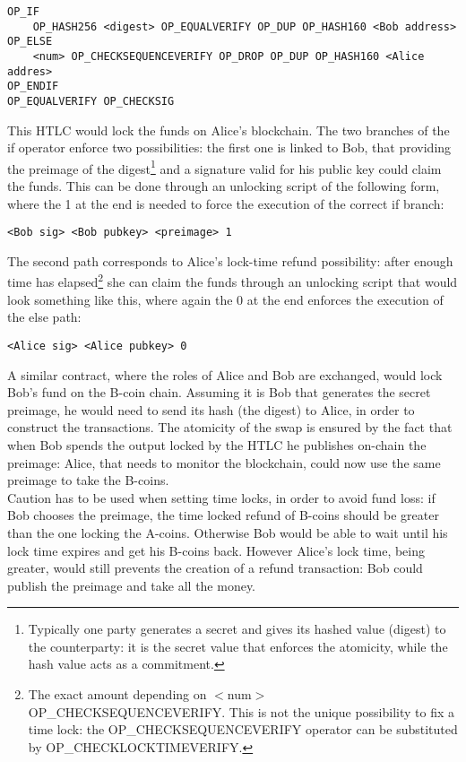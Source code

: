 \bigskip

\begin{lstlisting}[frame=single]
OP_IF 
	OP_HASH256 <digest> OP_EQUALVERIFY OP_DUP OP_HASH160 <Bob address>
OP_ELSE
	<num> OP_CHECKSEQUENCEVERIFY OP_DROP OP_DUP OP_HASH160 <Alice addres>
OP_ENDIF
OP_EQUALVERIFY OP_CHECKSIG
\end{lstlisting}

\bigskip
\noindent
This HTLC would lock the funds on Alice's blockchain. The two branches of the if operator enforce two possibilities: the first one is linked to Bob, that providing the preimage of the digest\footnote{Typically one party generates a secret and gives its hashed value (digest) to the counterparty: it is the secret value that enforces the atomicity, while the hash value acts as a commitment.} and a signature valid for his public key could claim the funds. This can be done through an unlocking script of the following form, where the 1 at the end is needed to force the execution of the correct if branch:

\bigskip

\begin{lstlisting}[frame=single]
<Bob sig> <Bob pubkey> <preimage> 1
\end{lstlisting}

\bigskip
\noindent
The second path corresponds to Alice's lock-time refund possibility: after enough time has elapsed\footnote{The exact amount depending on $<$num$>$ OP\_CHECKSEQUENCEVERIFY. This is not the unique possibility to fix a time lock: the OP\_CHECKSEQUENCEVERIFY operator can be substituted by OP\_CHECKLOCKTIMEVERIFY.} she can claim the funds through an unlocking script that would look something like this, where again the 0 at the end enforces the execution of the else path:

\bigskip

\begin{lstlisting}[frame=single]
<Alice sig> <Alice pubkey> 0
\end{lstlisting}

\bigskip
\noindent
A similar contract, where the roles of Alice and Bob are exchanged, would lock Bob's fund on the B-coin chain. Assuming it is Bob that generates the secret preimage, he would need to send its hash (the digest) to Alice, in order to construct the transactions. The atomicity of the swap is ensured by the fact that when Bob spends the output locked by the HTLC he publishes on-chain the preimage: Alice, that needs to monitor the blockchain, could now use the same preimage to take the B-coins.
\\
Caution has to be used when setting time locks, in order to avoid fund loss: if Bob chooses the preimage, the time locked refund of B-coins should be greater than the one locking the A-coins. Otherwise Bob would be able to wait until his lock time expires and get his B-coins back. However Alice's lock time, being greater, would still prevents the creation of a refund transaction: Bob could publish the preimage and take all the money.

